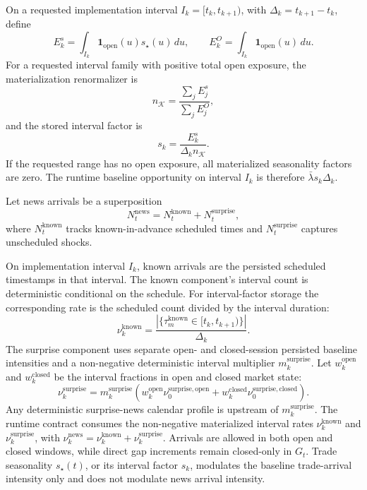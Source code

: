 \documentclass[11pt]{article}
\begin{document}
    On a requested implementation interval
    \(I_k=[t_k,t_{k+1})\), with \(\Delta_k=t_{k+1}-t_k\), define
    \[
        E_k^s
        =
        \int_{I_k}\mathbf{1}_{\mathrm{open}}(u)s_\star(u)\,du,
        \qquad
        E_k^O
        =
        \int_{I_k}\mathbf{1}_{\mathrm{open}}(u)\,du.
    \]
    For a requested interval family with positive total open exposure, the
    materialization renormalizer is
    \[
        n_{\mathcal K}
        =
        \frac{\sum_j E_j^s}{\sum_j E_j^O},
    \]
    and the stored interval factor is
    \[
        s_k
        =
        \frac{E_k^s}{\Delta_k n_{\mathcal K}}.
    \]
    If the requested range has no open exposure, all materialized
    seasonality factors are zero.
    The runtime baseline opportunity on interval \(I_k\) is therefore
    \(\bar\lambda s_k\Delta_k\).

    Let news arrivals be a superposition
    \[
        N_t^{\mathrm{news}} = N_t^{\mathrm{known}} + N_t^{\mathrm{surprise}},
    \]
    where \(N_t^{\mathrm{known}}\) tracks known-in-advance scheduled times and
    \(N_t^{\mathrm{surprise}}\) captures unscheduled shocks.

    On implementation interval \(I_k\), known arrivals are the
    persisted scheduled timestamps in that interval.
    The known component's interval count is deterministic conditional on the
    schedule.
    For interval-factor storage the corresponding rate is the
    scheduled count divided by the interval duration:
    \[
        \nu_k^{\mathrm{known}}
        =
        \frac{
            \left|\{\tau_m^{\mathrm{known}}\in[t_k,t_{k+1})\}\right|
        }{\Delta_k}.
    \]
    The surprise component uses separate open- and closed-session persisted
    baseline intensities and a non-negative deterministic interval multiplier
    \(m_k^{\mathrm{surprise}}\).
    Let \(w_k^{\mathrm{open}}\) and
    \(w_k^{\mathrm{closed}}\) be the interval fractions in open and closed
    market state:
    \[
        \nu_k^{\mathrm{surprise}}
        =
        m_k^{\mathrm{surprise}}
        \left(
            w_k^{\mathrm{open}}\nu_0^{\mathrm{surprise,open}}
            +w_k^{\mathrm{closed}}\nu_0^{\mathrm{surprise,closed}}
        \right).
    \]
    Any deterministic surprise-news calendar profile is upstream of
    \(m_k^{\mathrm{surprise}}\).
    The runtime contract consumes the non-negative materialized interval rates
    \(\nu_k^{\mathrm{known}}\) and \(\nu_k^{\mathrm{surprise}}\), with
    \(\nu_k^{\mathrm{news}}=\nu_k^{\mathrm{known}}+\nu_k^{\mathrm{surprise}}\).
    Arrivals are allowed in both open and closed windows, while direct gap
    increments remain closed-only in \(G_t\).
    Trade seasonality \(s_\star(t)\), or its interval factor \(s_k\), modulates
    the baseline trade-arrival intensity only and does not modulate news
    arrival intensity.
\end{document}
